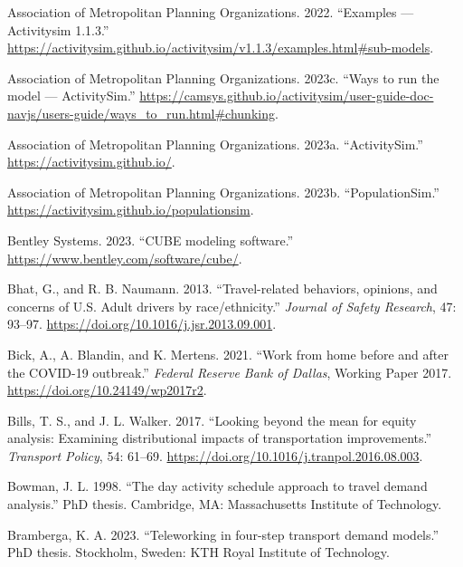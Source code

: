 \documentclass[fancy, oneside, mastersfancy, ms]{byuthesis}
\newlength{\cslhangindent}
\newenvironment{CSLReferences}[2] %
 {\begin{list}{}{%
  \setlength{\itemindent}{0pt}
  \setlength{\leftmargin}{0pt}
  \setlength{\parsep}{0pt}
  \ifodd #1
   \setlength{\leftmargin}{\cslhangindent}
   \setlength{\itemindent}{-1\cslhangindent}
  \fi
  \setlength{\itemsep}{#2\baselineskip}}}
 {\end{list}}
\begin{document}
\label{refs}
\begin{CSLReferences}{1}{0}
Association of Metropolitan Planning Organizations. 2022. {``Examples
--- {Activitysim} 1.1.3.''}
\url{https://activitysim.github.io/activitysim/v1.1.3/examples.html\#sub-models}.

Association of Metropolitan Planning Organizations. 2023c. {``Ways to
run the model --- {ActivitySim}.''}
\url{https://camsys.github.io/activitysim/user-guide-doc-navjs/users-guide/ways\_to\_run.html\#chunking}.

Association of Metropolitan Planning Organizations. 2023a.
{``{ActivitySim}.''} \url{https://activitysim.github.io/}.

Association of Metropolitan Planning Organizations. 2023b.
{``{PopulationSim}.''} \url{https://activitysim.github.io/populationsim}.

Bentley Systems. 2023. {``{CUBE} modeling software.''}
\url{https://www.bentley.com/software/cube/}.

Bhat, G., and R. B. Naumann. 2013. {``Travel-related behaviors,
opinions, and concerns of {U}.{S}. Adult drivers by race/ethnicity.''}
\emph{Journal of Safety Research}, 47: 93--97.
\url{https://doi.org/10.1016/j.jsr.2013.09.001}.

Bick, A., A. Blandin, and K. Mertens. 2021. {``Work from home before and
after the {COVID-19} outbreak.''} \emph{Federal Reserve Bank of Dallas},
Working Paper 2017. \url{https://doi.org/10.24149/wp2017r2}.

Bills, T. S., and J. L. Walker. 2017. {``Looking beyond the mean for
equity analysis: Examining distributional impacts of transportation
improvements.''} \emph{Transport Policy}, 54: 61--69.
\url{https://doi.org/10.1016/j.tranpol.2016.08.003}.

Bowman, J. L. 1998. {``The day activity schedule approach to travel
demand analysis.''} PhD thesis. Cambridge, MA: Massachusetts Institute
of Technology.

Bramberga, K. A. 2023. {``Teleworking in four-step transport demand
models.''} PhD thesis. Stockholm, Sweden: KTH Royal Institute of
Technology.


\end{CSLReferences}
\end{document}
